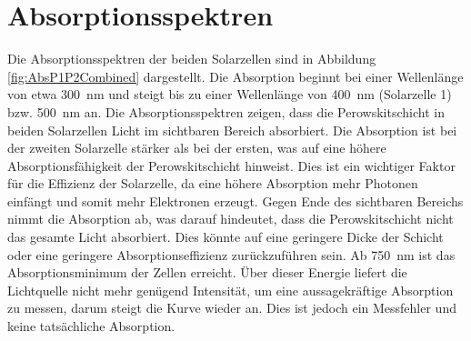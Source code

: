 \documentclass[12pt,a4paper,ngerman]{report}
\begin{document}
	\section{Absorptionsspektren}
		Die Absorptionsspektren der beiden Solarzellen sind in Abbildung \ref{fig:AbsP1P2Combined} dargestellt. Die Absorption beginnt bei einer Wellenlänge von etwa \SI{300}{\nano\meter} und steigt bis zu einer Wellenlänge von \SI{400}{\nano\meter} (Solarzelle 1) bzw. \SI{500}{\nano\meter} an. Die Absorptionsspektren zeigen, dass die Perowskitschicht in beiden Solarzellen Licht im sichtbaren Bereich absorbiert. Die Absorption ist bei der zweiten Solarzelle stärker als bei der ersten, was auf eine höhere Absorptionsfähigkeit der Perowskitschicht hinweist. Dies ist ein wichtiger Faktor für die Effizienz der Solarzelle, da eine höhere Absorption mehr Photonen einfängt und somit mehr Elektronen erzeugt.
		Gegen Ende des sichtbaren Bereichs nimmt die Absorption ab, was darauf hindeutet, dass die Perowskitschicht nicht das gesamte Licht absorbiert. Dies könnte auf eine geringere Dicke der Schicht oder eine geringere Absorptionseffizienz zurückzuführen sein.
		Ab \SI{750}{\nano\meter} ist das Absorptionsminimum der Zellen erreicht. Über dieser Energie liefert die Lichtquelle nicht mehr genügend Intensität, um eine aussagekräftige Absorption zu messen, darum steigt die Kurve wieder an. Dies ist jedoch ein Messfehler und keine tatsächliche Absorption.		
\end{document}
